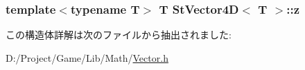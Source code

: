 \subsubsection[{z}]{\setlength{\rightskip}{0pt plus 5cm}template$<$typename T$>$ T {\bf St\+Vector4\+D}$<$ T $>$\+::z}\label{struct_st_vector4_d_a3b66d5401355352473b13e4a4503de2e}


この構造体詳解は次のファイルから抽出されました\+:\begin{DoxyCompactItemize}
\item 
D\+:/\+Project/\+Game/\+Lib/\+Math/\hyperlink{_vector_8h}{Vector.\+h}\end{DoxyCompactItemize}
